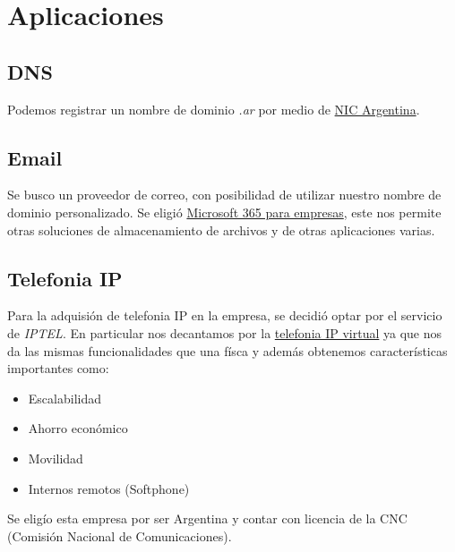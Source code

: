 \documentclass[11pt]{article}
\begin{document}
    \section{Aplicaciones}
    
        \subsection{DNS}
        Podemos registrar un nombre de dominio \textit{.ar} por medio de \href{https://nic.ar/es/dominios/aranceles}{NIC Argentina}.


        \subsection{Email}
        Se busco un proveedor de correo, con posibilidad de utilizar nuestro nombre de dominio personalizado. Se eligió \href{https://www.microsoft.com/es-ar/microsoft-365/business}{Microsoft 365 para empresas}, este nos permite otras soluciones de almacenamiento de archivos y de otras aplicaciones varias.

        \subsection{Telefonia IP}
        Para la adquisión de telefonia IP en la empresa, se decidió optar por el servicio de \textit{IPTEL}. En particular nos decantamos por la
        \href{https://www.iptel.com.ar/centrales-telefonicas/virtuales/}{telefonia IP virtual} ya que nos da las mismas funcionalidades que una físca y además obtenemos
        características importantes como:
        \begin{itemize}
            \item Escalabilidad
            \item Ahorro económico
            \item Movilidad
            \item Internos remotos (Softphone)
        \end{itemize}

        Se eligío esta empresa por ser Argentina y contar con licencia de la CNC (Comisión Nacional de Comunicaciones).
\end{document}
